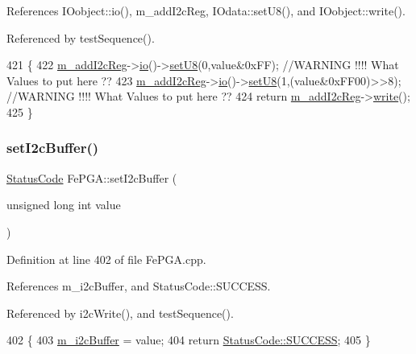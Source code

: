 References I\+Oobject\+::io(), m\+\_\+add\+I2c\+Reg, I\+Odata\+::set\+U8(), and I\+Oobject\+::write().



Referenced by test\+Sequence().


\begin{DoxyCode}
421                                                     \{
422   \hyperlink{classFePGA_af3ef3467ba803e6d3b970ea8982d6246}{m\_addI2cReg}->\hyperlink{classIOobject_af04fb94137c3d86849f478ac5afab5d1}{io}()->\hyperlink{classIOdata_a6c4fb2f2af01889ada889c2b7aceb24d}{setU8}(0,value&0xFF); \textcolor{comment}{//WARNING !!!! What Values to put here ??}
423   \hyperlink{classFePGA_af3ef3467ba803e6d3b970ea8982d6246}{m\_addI2cReg}->\hyperlink{classIOobject_af04fb94137c3d86849f478ac5afab5d1}{io}()->\hyperlink{classIOdata_a6c4fb2f2af01889ada889c2b7aceb24d}{setU8}(1,(value&0xFF00)>>8); \textcolor{comment}{//WARNING !!!! What Values to put here
       ??}
424   \textcolor{keywordflow}{return} \hyperlink{classFePGA_af3ef3467ba803e6d3b970ea8982d6246}{m\_addI2cReg}->\hyperlink{classIOobject_a9f6984bc9f0fadcf800f1be2523ac744}{write}();
425 \}
\end{DoxyCode}
\mbox{\label{classFePGA_aaf52ed549f6b79d53f49c3f85c5fbad2}} 
\subsubsection{\texorpdfstring{set\+I2c\+Buffer()}{setI2cBuffer()}}
{\footnotesize\ttfamily \hyperlink{classStatusCode}{Status\+Code} Fe\+P\+G\+A\+::set\+I2c\+Buffer (\begin{DoxyParamCaption}\item[{unsigned long int}]{value }\end{DoxyParamCaption})}



Definition at line 402 of file Fe\+P\+G\+A.\+cpp.



References m\+\_\+i2c\+Buffer, and Status\+Code\+::\+S\+U\+C\+C\+E\+SS.



Referenced by i2c\+Write(), and test\+Sequence().


\begin{DoxyCode}
402                                                        \{
403   \hyperlink{classFePGA_a173664ffd6a73f454ae31f51e689dd16}{m\_i2cBuffer} = value;
404   \textcolor{keywordflow}{return} \hyperlink{classStatusCode_a6f565cbeadc76d14c72f047e5e85eb4badd0da38d3ba0d922efd1f4619bc37ad8}{StatusCode::SUCCESS};
405 \}
\end{DoxyCode}
\mbox{\label{classFePGA_ac9a16de5f01fda901494abe61efb5029}} 
